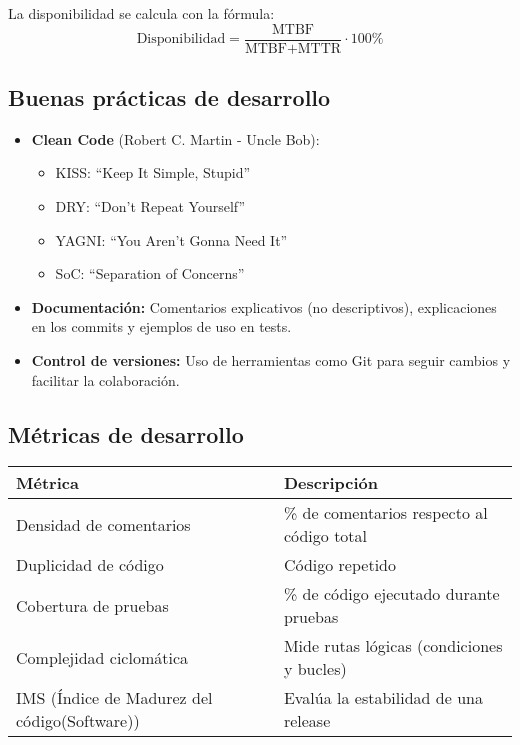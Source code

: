 \begin{definicion}
    La disponibilidad se calcula con la fórmula:
    \[
        \text{Disponibilidad} = \frac{\text{MTBF}}{\text{MTBF} + \text{MTTR}} \cdot 100\%
    \]
\end{definicion}

\subsection{Buenas prácticas de desarrollo}\label{subsec:buenas-practicas-de-desarrollo}

\begin{itemize}
    \item \textbf{Clean Code} (Robert C. Martin - Uncle Bob):
    \begin{itemize}
        \item KISS: “Keep It Simple, Stupid”
        \item DRY: “Don’t Repeat Yourself”
        \item YAGNI: “You Aren’t Gonna Need It”
        \item SoC: “Separation of Concerns”
    \end{itemize}
    \item \textbf{Documentación:} Comentarios explicativos (no descriptivos), explicaciones en los commits y ejemplos de uso en tests.
    \item \textbf{Control de versiones:} Uso de herramientas como Git para seguir cambios y facilitar la colaboración.
\end{itemize}

\subsection{Métricas de desarrollo}\label{subsec:metricas-de-desarrollo}

\begin{center}
    \begin{tabular}{|l|l|}
        \hline
        \textbf{Métrica}                             & \textbf{Descripción}                       \\
        \hline
        Densidad de comentarios                      & \% de comentarios respecto al código total \\
        Duplicidad de código                         & Código repetido                            \\
        Cobertura de pruebas                         & \% de código ejecutado durante pruebas     \\
        Complejidad ciclomática                      & Mide rutas lógicas (condiciones y bucles)  \\
        IMS (Índice de Madurez del código(Software)) & Evalúa la estabilidad de una release       \\
        \hline
    \end{tabular}
\end{center}

